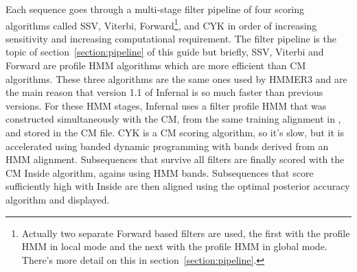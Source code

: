 Each sequence goes through a multi-stage filter pipeline of four
scoring algorithms called SSV, Viterbi, Forward\footnote{Actually two
  separate Forward based filters are used, the first with the profile
  HMM in local mode and the next with the profile HMM in global
  mode. There's more detail on this in
  section~\ref{section:pipeline}.}, and CYK in order of increasing
sensitivity and increasing computational requirement. The filter
pipeline is the topic of section~\ref{section:pipeline} of this guide
but briefly, SSV, Viterbi and Forward are profile HMM algorithms which
are more efficient than CM algorithms. These three algorithms are the
same ones used by HMMER3 and are the main reason that version 1.1 of
Infernal is so much faster than previous versions. For these HMM
stages, Infernal uses a filter profile HMM that was constructed
simultaneously with the CM, from the same training alignment in
, and stored in the CM file. CYK is a CM scoring
algorithm, so it's slow, but it is accelerated using banded dynamic
programming with bands derived from an HMM alignment. Subsequences
that survive all filters are finally scored with the CM Inside
algorithm, agains using HMM bands. Subsequences that score
sufficiently high with Inside are then aligned using the optimal
posterior accuracy algorithm and displayed.


